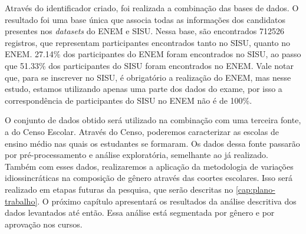 Através do identificador criado, foi realizada a combinação das bases de dados. O resultado foi uma base única que associa todas as informações dos candidatos presentes nos \textit{datasets} do ENEM e SISU. Nessa base, são encontrados 712526 registros, que representam participantes encontrados tanto no SISU, quanto no ENEM. 27.14\% dos participantes do ENEM foram encontrados no SISU, ao passo que 51.33\% dos participantes do SISU foram encontrados no ENEM. Vale notar que, para se inscrever no SISU, é obrigatório a realização do ENEM, mas nesse estudo, estamos utilizando apenas uma parte dos dados do exame, por isso a correspondência de participantes do SISU no ENEM não é de 100\%.

O conjunto de dados obtido será utilizado na combinação com uma terceira fonte, a do Censo Escolar. Através do Censo, poderemos caracterizar as escolas de ensino médio nas quais os estudantes se formaram. Os dados dessa fonte passarão por pré-processamento e análise exploratória, semelhante ao já realizado. Também com esses dados, realizaremos a aplicação da metodologia de variações idiossincráticas na composição de gênero através das coortes escolares. Isso será realizado em etapas futuras da pesquisa, que serão descritas no \autoref{cap:plano-trabalho}. O próximo capítulo apresentará os resultados da análise descritiva dos dados levantados até então. Essa análise está segmentada por gênero e por aprovação nos cursos.